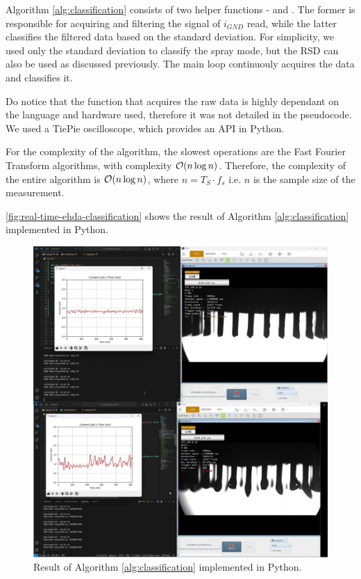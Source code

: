 \documentclass[oneside,12pt]{article}
\begin{document}
Algorithm \ref{alg:classification} consists of two helper functions - 
and . The former is responsible for acquiring and filtering the signal of $i_{GND}$ read,
while the latter classifies the filtered data based on the standard deviation.
For simplicity, we used only the standard deviation to classify the spray mode, 
but the RSD can also be used as discussed previously. 
The main loop continuouly acquires the data and classifies it.

Do notice that the function that acquires the raw data is highly dependant on the language and hardware 
used, therefore it was not detailed in the pseudocode. We used a TiePie oscilloscope, which
provides an API in Python.

For the complexity of the algorithm, the slowest operations are the Fast Fourier
Transform algorithms, with complexity $\mathcal{O} (n\log{}n)$. Therefore, the complexity 
of the entire algorithm is $\mathcal{O} (n\log{}n)$, where $n = T_S \cdot f_s$ i.e. $n$ is the 
sample size of the measurement.

\autoref{fig:real-time-ehda-classification}
shows the result of Algorithm \ref{alg:classification} implemented in Python.

\begin{figure}[h!]
    \centering
    \includegraphics[width=\textwidth,trim=1 1 1 1,clip]{figures/real-time-ehda-classification.png}
    \caption{Result of Algorithm \ref{alg:classification} implemented in Python.}
    \label{fig:real-time-ehda-classification}
\end{figure}
\end{document}
